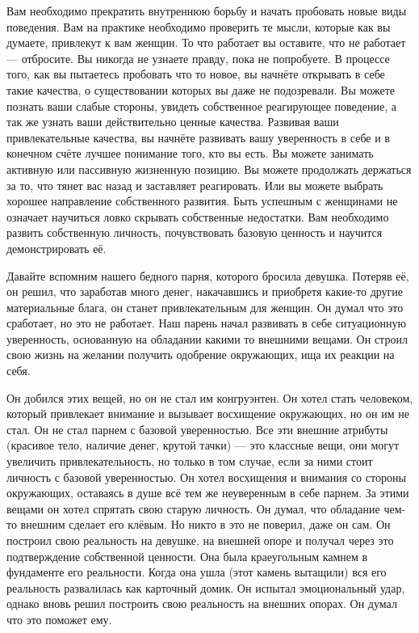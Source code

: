 Вам необходимо прекратить внутреннюю борьбу и начать пробовать новые виды поведения. Вам на практике необходимо проверить те мысли, которые как вы думаете, привлекут к вам женщин. То что работает вы оставите, что не работает --- отбросите. Вы никогда не узнаете правду, пока не попробуете. В процессе того, как вы пытаетесь пробовать что то новое, вы начнёте открывать в себе такие качества, о существовании которых вы даже не подозревали. Вы можете познать ваши слабые стороны, увидеть собственное реагирующее поведение, а так же узнать ваши действительно ценные качества. Развивая ваши привлекательные качества, вы начнёте развивать вашу уверенность в себе и в конечном счёте лучшее понимание того, кто вы есть. Вы можете занимать активную или пассивную жизненную позицию. Вы можете продолжать держаться за то, что тянет вас назад и заставляет реагировать. Или вы можете выбрать хорошее направление собственного развития. Быть успешным с женщинами не означает научиться ловко скрывать собственные недостатки. Вам необходимо развить собственную личность, почувствовать базовую ценность и научится демонстрировать её.

Давайте вспомним нашего бедного парня, которого бросила девушка. Потеряв её, он решил, что заработав много денег, накачавшись и приобретя какие-то другие материальные блага, он станет привлекательным для женщин. Он думал что это сработает, но это не работает. Наш парень начал развивать в себе ситуационную уверенность, основанную на обладании какими то внешними вещами. Он строил свою жизнь на желании получить одобрение окружающих, ища их реакции на себя.

Он добился этих вещей, но он не стал им конгруэнтен. Он хотел стать человеком, который привлекает внимание и вызывает восхищение окружающих, но он им не стал. Он не стал парнем с базовой уверенностью. Все эти внешние атрибуты (красивое тело, наличие денег, крутой тачки) --- это классные вещи, они могут увеличить привлекательность, но только в том случае, если за ними стоит личность с базовой уверенностью. Он хотел восхищения и внимания со стороны окружающих, оставаясь в душе всё тем же неуверенным в себе парнем. За этими вещами он хотел спрятать свою старую личность. Он думал, что обладание чем-то внешним сделает его клёвым. Но никто в это не поверил, даже он сам. Он построил свою реальность на девушке, на внешней опоре и получал через это подтверждение собственной ценности. Она была краеугольным камнем в фундаменте его реальности. Когда она ушла (этот камень вытащили) вся его реальность развалилась как карточный домик. Он испытал эмоциональный удар, однако вновь решил построить свою реальность на внешних опорах. Он думал что это поможет ему.

